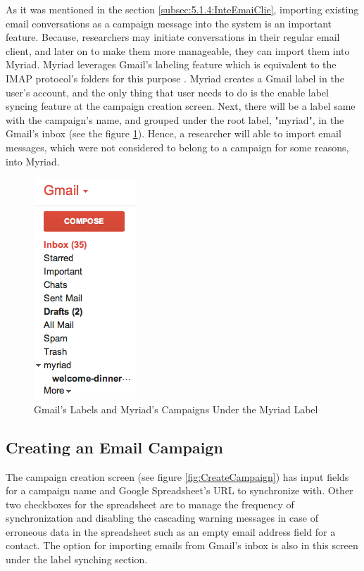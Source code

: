 As it was mentioned in the section \ref{subsec:5.1.4:InteEmaiClie}, importing existing email conversations as a campaign message into the system is an important feature. Because, researchers may initiate conversations in their regular email client, and later on to make them more manageable, they can import them into Myriad. Myriad leverages Gmail's labeling feature which is equivalent to the \ac{IMAP} protocol's folders for this purpose \citep{GoogleInc.2013}. Myriad creates a Gmail label in the user's account, and the only thing that user needs to do is the enable label syncing feature at the campaign creation screen. Next, there will be a label same with the campaign's name, and grouped under the root label, "myriad", in the Gmail's inbox (see the figure \ref{fig:GmailLabels}). Hence, a researcher will able to import email messages, which were not considered to belong to a campaign for some reasons, into Myriad.

\clearpage

\begin{figure}[htbp]
	\centering
	\includegraphics[scale=0.60]{imgs/GmailLabels.png}
	\caption[Gmail's Labels and Myriad's Campaigns Under the Myriad Label]{Gmail's Labels and Myriad's Campaigns Under the Myriad Label}
	\label{fig:GmailLabels}
\end{figure}

\subsection{Creating an Email Campaign}
\label{subsec:5.2.3:CreaEmaiCamp}

The campaign creation screen (see figure \ref{fig:CreateCampaign}) has input fields for a campaign name and Google Spreadsheet's \ac{URL} to synchronize with. Other two checkboxes for the spreadsheet are to manage the frequency of synchronization and disabling the cascading warning messages in case of erroneous data in the spreadsheet such as an empty email address field for a contact. The option for importing emails from Gmail's inbox is also in this screen under the label synching section.

